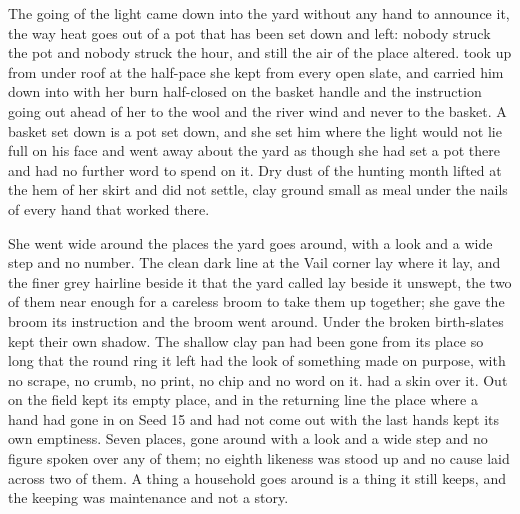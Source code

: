 The going of the light came down into the yard without any hand to announce it, the way heat goes out of a pot that has been set down and left: nobody struck the pot and nobody struck the hour, and still the air of the place altered.  took  up from  under  roof at the half-pace she kept from every open slate, and carried him down into  with her burn half-closed on the basket handle and the instruction going out ahead of her to the wool and the river wind and never to the basket. A basket set down is a pot set down, and she set him where the light would not lie full on his face and went away about the yard as though she had set a pot there and had no further word to spend on it. Dry dust of the hunting month lifted at the hem of her skirt and did not settle, clay ground small as meal under the nails of every hand that worked there.

She went wide around the places the yard goes around, with a look and a wide step and no number. The clean dark line at the Vail corner lay where it lay, and the finer grey hairline beside it that the yard called  lay beside it unswept, the two of them near enough for a careless broom to take them up together; she gave the broom its instruction and the broom went around. Under  the broken birth-slates kept their own shadow. The shallow clay pan had been gone from its place so long that the round ring it left had the look of something made on purpose, with no scrape, no crumb, no print, no chip and no word on it.  had a skin over it. Out on  the field kept its empty place, and in the returning line the place where a hand had gone in on Seed 15 and had not come out with the last hands kept its own emptiness. Seven places, gone around with a look and a wide step and no figure spoken over any of them; no eighth likeness was stood up and no cause laid across two of them. A thing a household goes around is a thing it still keeps, and the keeping was maintenance and not a story.

